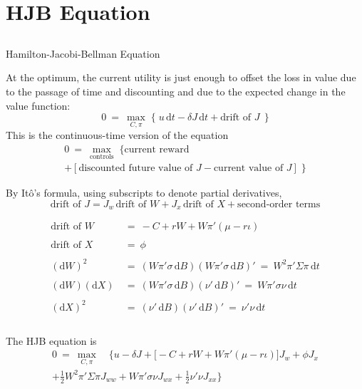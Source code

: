 \documentclass[10pt]{beamer}
\newcommand{\D}{\mathrm{d}}
\begin{document}
\section{HJB Equation}\subsection{}
\begin{frame}{Hamilton-Jacobi-Bellman Equation}

 At the optimum, the current utility is just enough to offset the loss in value due to the passage of time and discounting and due to the expected change in the value function:
$$ 0 \ = \ \max_{C,\pi} \;\big\{ \; u\,\D t - \delta J\,\D t + \text{drift of $J$}\;\,\big\}
$$
This is the continuous-time version of the equation
\begin{multline*}
    0 \ = \ \max_{\text{controls}} \; \big\{ \text{current reward} \\+ [\text{discounted future value of $J$} - \text{current value of $J$}] \;\big\}
\end{multline*}

 By It\^o's formula, using subscripts to denote partial derivatives,
$$
\text{drift of $J$} = J_w \,\text{drift of $W$} + J_x \,\text{drift of $X$} + \text{second-order terms}
$$
\end{frame}

\begin{frame}
\begin{align*}
\text{drift of $W$} \ &= \ -C + rW + W\pi'(\mu - r\iota)\\ \\ 
\text{drift of $X$} \ &= \ \phi\ \\ \\
(\D W)^2 \ &= \ (W \pi'\sigma\,\D B)(W\pi'\sigma\,\D B)' \ = \ W^2\pi'\Sigma\pi\,\D t\\ \\ 
(\D W)(\D X) \ &= \  (W\pi'\sigma \,\D B)(\nu'\,\D B)' \ = \ W\pi'\sigma\nu\,\D t\\ \\
  (\D X)^2 \ &= \ (\nu'\,\D B)(\nu'\,\D B)' \ = \ \nu'\nu\,\D t\\ \\ 
\end{align*}
\end{frame}

\begin{frame}
The HJB equation is
\begin{multline*} 0 \ = \ \max_{C,\pi} \quad \bigg\{u - \delta J + \big[-C + rW + W\pi'(\mu - r\iota)\big]J_w + \phi J_x \\
+ \frac{1}{2}W^2\pi'\Sigma\pi J_{ww} + W\pi'\sigma\nu J_{wx} 
+ \frac{1}{2}\nu'\nu J_{xx} \bigg\}
\end{multline*}

\end{frame}
\end{document}
